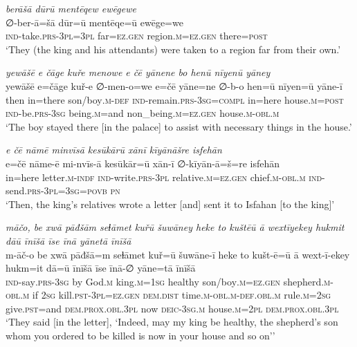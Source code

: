 \ea \label{KŠ.48}
\textit{berāšā dūrū mentēqew ewēgewe} \\ 
\gll ∅-ber-ā=šā dūr=ū mentēqe=ū ewēge=we \\ 
 \textsc{ind-}take\textsc{.prs}\textsc{-3pl}\textsc{=3pl} far\textsc{=ez.gen} region\textsc{.m}\textsc{=ez.gen} there\textsc{=\textsc{post}} \\ 
\glt `They (the king and his attendants) were taken to a region far from their own.'
\z 
 
\ea \label{KŠ.49}
\textit{yewāšē e čāge kuře menowe e čē yānene bo henū nīyenū yāney} \\ 
\gll yewāšē e=čāge kuř-e ∅-men-o=we e=čē yāne=ne ∅-b-o hen=ū nīyen=ū yāne-ī \\ 
 then in=there son/boy\textsc{.m}\textsc{-def} \textsc{ind-}remain\textsc{.prs}\textsc{-3sg}\textsc{=compl} in=here house\textsc{.m}\textsc{=\textsc{post}} \textsc{ind-}be\textsc{.prs}\textsc{-3sg} being\textsc{.m}=and non\_being\textsc{.m}\textsc{=ez.gen} house\textsc{.m}\textsc{-obl}\textsc{.m} \\ 
\glt `The boy stayed there [in the palace] to assist with necessary things in the house.'
\z 
 
\ea \label{KŠ.50}
\textit{e čē nāmē minvīsā kesūkārū xānī kīyānāšre isfehān} \\ 
\gll e=čē nāme-ē mi-nvīs-ā kesūkār=ū xān-ī ∅-kīyān-ā=š=re isfehān \\ 
 in=here letter\textsc{.m}\textsc{-indf} \textsc{ind-}write\textsc{.prs}\textsc{-3pl} relative\textsc{.m}\textsc{=ez.gen} chief\textsc{.m}\textsc{-obl}\textsc{.m} \textsc{ind-}send\textsc{.prs}\textsc{-3pl}\textsc{=3sg}\textsc{=\textsc{povb}} \textsc{pn} \\ 
\glt `Then, the king’s relatives wrote a letter [and] sent it to Isfahan [to the king]'
\z 
 
\ea \label{KŠ.51}
\textit{māčo, be xwā pāđšām seɫāmet kuřū šuwāney heke to kuštēū ā wextīyekey hukmit dāū īnīšā īse īnā yānetā īnīšā} \\ 
\gll m-āč-o be xwā pāđšā=m seɫāmet kuř=ū šuwāne-ī heke to kušt-ē=ū ā wext-ī-ekey hukm=it dā=ū īnīšā īse īnā-∅ yāne=tā īnīšā \\ 
 \textsc{ind-}say\textsc{.prs}\textsc{-3sg} by God\textsc{.m} king\textsc{.m}\textsc{=\textsc{1sg}} healthy son/boy\textsc{.m}\textsc{=ez.gen} shepherd\textsc{.m}\textsc{-obl}\textsc{.m} if \textsc{2sg} kill\textsc{.pst}\textsc{-3pl}\textsc{=ez.gen} \textsc{dem.dist} time\textsc{.m}\textsc{-obl}\textsc{.m}\textsc{-def}\textsc{.obl}\textsc{.m} rule\textsc{.m}\textsc{=\textsc{2sg}} give\textsc{.pst}=and \textsc{dem.prox}\textsc{.obl}\textsc{.3pl} now \textsc{deic}\textsc{-3sg}\textsc{.m} house\textsc{.m}=\textsc{2pl} \textsc{dem.prox}\textsc{.obl}\textsc{.3pl} \\ 
\glt `They said [in the letter], ‘Indeed, may my king be healthy, the shepherd’s son whom you ordered to be killed is now in your house and so on’'
\z 
 
